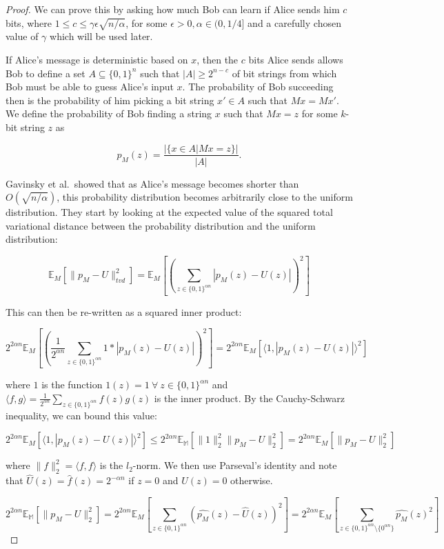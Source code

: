 \documentclass[a4paper]{article}
\begin{document}
        \begin{proof}
        We can prove this by asking how much Bob can learn if Alice sends him $c$ bits, where $1 \leq c \leq \gamma \epsilon\sqrt{n/\alpha}$, for some $\epsilon > 0, \alpha \in (0,1/4]$ and a carefully chosen value of $\gamma$ which will be used later.

        If Alice's message is deterministic based on $x$, then the $c$ bits Alice sends allows Bob to define a set $A \subseteq \{0, 1\}^n$ such that $|A| \geq 2^{n-c}$ of bit strings from which Bob must be able to guess Alice's input $x$. The probability of Bob succeeding then is the probability of him picking a bit string $x' \in A$ such that $Mx = Mx'$. We define the probability of Bob finding a string $x$ such that $Mx = z$ for some $k$-bit string $z$ as

        $$p_M(z) = \frac{|\{x \in A|Mx = z\}|}{|A|}.$$

        Gavinsky et al.~showed that as Alice's message becomes shorter than $O(\sqrt{n/\alpha})$, this probability distribution becomes arbitrarily close to the uniform distribution. They start by looking at the expected value of the squared total variational distance between the probability distribution and the uniform distribution:

        $$\mathbb{E}_M[\|p_M - U\|_{tvd}^2] = \mathbb{E}_M[(\sum_{z \in \{0, 1\}^{\alpha n}}|p_M(z) - U(z)|)^2]$$

        This can then be re-written as a squared inner product:

        $$2^{2\alpha n}\mathbb{E}_M\left[\left(\frac{1}{2^{\alpha n}}\sum_{z \in \{0, 1\}^{\alpha n}}1 * |p_M(z) - U(z)|\right)^2\right] = 2^{2\alpha n}\mathbb{E}_M[\langle 1, |p_M(z) - U(z)|\rangle^2]$$

        where $1$ is the function $1(z) = 1~\forall~z\in\{0, 1\}^{\alpha n}$ and $\langle f, g\rangle = \frac{1}{2^{\alpha n}}\sum_{z \in \{0, 1\}^{\alpha n}}f(z)g(z)$ is the inner product. By the Cauchy-Schwarz inequality, we can bound this value:

        $$2^{2\alpha n}\mathbb{E}_M[\langle 1, |p_M(z) - U(z)|\rangle^2] \leq 2^{2\alpha n}\mathbb{E_M}[\|1\|_2^2\|p_M - U\|_2^2] = 2^{2\alpha n}\mathbb{E}_M[\|p_M - U\|_2^2]$$

        where $\|f\|_2^2 = \langle f, f\rangle$ is the $l_2$-norm. We then use Parseval's identity and note that $\widehat{U}(z) = \widehat{f}(z) = 2^{-\alpha n}$ if $z = 0$ and $\widehat{U}(z) = 0$ otherwise.

        $$2^{2\alpha n}\mathbb{E_M}[\|p_M - U\|_2^2] = 2^{2\alpha n}\mathbb{E}_M\left[\sum_{z \in \{0, 1\}^{\alpha n}}(\widehat{p_M}(z) - \widehat{U}(z))^2\right] = 2^{2\alpha n}\mathbb{E}_M\left[\sum_{z \in \{0, 1\}^{\alpha n}\setminus\{0^{\alpha n}\}}\widehat{p_M}(z)^2\right]$$


\end{proof}
\end{document}
